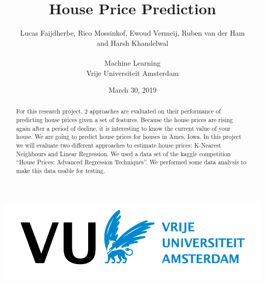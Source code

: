 \documentclass[a4paper,11pt]{article}
\title{House Price Prediction}
\date{March 30, 2019}
\author{Lucas Faijdherbe, Rico Mossinkof, Ewoud Vermeij, Ruben van der Ham\\ and Harsh Khandelwal\\\\
\small Machine Learning\\
\small Vrije Universiteit Amsterdam}
\begin{document}
\begin{titlepage}

\centering
\maketitle
\includegraphics[width=0.8\linewidth]{images/vulogo.png}

\end{titlepage}
\clearpage

\tableofcontents
\clearpage




\begin{abstract}
For this research project, 2 approaches are evaluated on their performance of predicting house prices given a set of features. Because the house prices are rising again after a period of decline, it is interesting to know the current value of your house. We are going to predict house prices for houses in Ames, Iowa.
    In this project we will evaluate two different approaches to estimate house prices: K-Nearest Neighbours and Linear Regression. We used a data set of the kaggle competition “House Prices: Advanced Regression Techniques”. We performed some data analysis to make this data usable for testing. 
\end{abstract}
\end{document}
